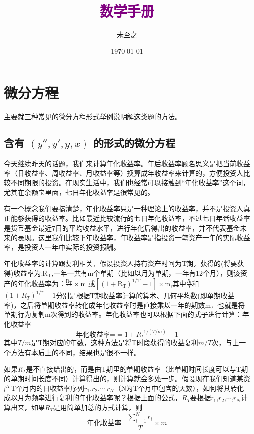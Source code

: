 \documentclass[a4paper,fontset=ubuntu,12pt]{ctexart}
\title{\kaishu \huge \textcolor{purple}{数学手册}}
\author{未至之}
\date{\today}
\newcommand{\hyht}{\CJKfamily{hyht}}
\begin{document}
\maketitle
\newpage
\section{微分方程}
{\kaishu 主要就三种常见的微分方程形式举例说明解这类题的方法。}
\subsection{含有 $(y'',y',y,x)$ 的形式的微分方程}

{\kaishu 今天继续昨天的话题，我们来计算年化收益率。年后收益率顾名思义是把当前收益率（日收益率、周收益率、月收益率等）换算成年收益率来计算的，方便投资人比较不同期限的投资。在现实生活中，我们也经常可以接触到“年化收益率”这个词，尤其在余额宝里面，七日年化收益率是很常见的。}

{\hyht  有一个概念我们要搞清楚，年化收益率只是一种理论上的收益率，并不是投资人真正能够获得的收益率。比如最近比较流行的七日年化收益率，不过七日年话收益率是货币基金最近7日的平均收益水平，进行年化后得出的收益率，并不代表基金未来的表现。这里我们比较下年收益率，年收益率是指投资一笔资产一年的实际收益率，是投资人一年中实际的投资报酬。}  

年化收益率的计算跟复利相关，假设投资人持有资产时间为T期，获得的(将要获得)收益率为:${{{\text{R}}_{\text{T}}}}$,一年一共有m个单期（比如以月为单期，一年有12个月），则该资产的年化收益率为：$\frac{{{\text{R}}_{\text{T}}}}{\text{T}}\times \text{m}$ 或$\left[ {{\left( 1+{{\text{R}}_{\text{T}}} \right)}^{1/\text{T}}}-1 \right]\times \text{m}$,其中$\frac{R_t}{T}$和${(1+R_T)}^{1/T}-1$分别是根据T期收益率计算的算术、几何平均数(即单期收益率)，之后将单期收益率转化成年化收益率时是直接乘以一年的期数m，也就是将单期行为复制m次得到的收益率。年化收益率也可以根据下面的式子进行计算：年化收益率$$\text{年化收益率=}={1+R_t}^{1/(T/m)}-1$$ 
其中$T/m$是T期对应的年数，这种方法是将T时段获得的收益复利$m/T$次，与上一个方法有本质上的不同，结果也是很不一样。

如果$R_T$是不直接给出的，而是由T期里的单期收益率（此单期时间长度可以与T期的单期时间长度不同）计算得出的，则计算就会多处一步。假设现在我们知道某资产T个月内的日收益率序列$r_1$,$r_2$,$\cdots$,$r_N$（N为T个月中包含的天数），如何将其转化成以月为频率进行复利的年化收益率呢？根据上面的公式，$R_T$要根据$r_1$,$r_2$,$\cdots$,$r_N$计算出来，如果$R_T$是用简单加总的方式计算，则
$${\text{年化收益率=}\frac{\sum\nolimits_{i=1}^{N}{{r_i}}}{T}\times m } $$
\end{document}

